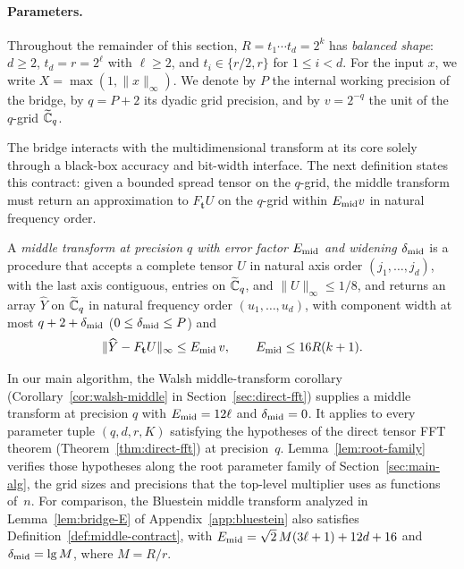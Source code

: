 \paragraph{Parameters.}
Throughout the remainder of this section, $R=t_1\cdots t_d=2^k$ has \emph{balanced shape}: $d\ge 2$, $t_d=r=2^\ell$ with
$\ell\ge 2$, and $t_i\in\{r/2,r\}$ for $1\le i<d$. For the input $x$, we write $X=\max(1,\|x\|_\infty)$. We denote by
$P$ the internal working precision of the bridge, by $q=P+2$ its dyadic grid precision, and by $v=2^{-q}$ the unit of
the $q$-grid $\widetilde{\mathbb{C}}_q$.

The bridge interacts with the multidimensional transform at its core solely through a black-box accuracy and bit-width
interface. The next definition states this contract: given a bounded spread tensor on the $q$-grid, the middle transform
must return an approximation to $F_{\mathbf t}U$ on the $q$-grid within $E_{\rm mid}v$ in natural frequency order.

\begin{definition}\label{def:middle-contract}
A \emph{middle transform at precision $q$ with error factor $E_{\rm mid}$ and widening $\delta_{\rm mid}$} is a
procedure that accepts a complete tensor $U$ in natural axis order $(j_1,\dots,j_d)$, with the last axis contiguous,
entries on $\widetilde{\mathbb{C}}_q$, and $\|U\|_\infty\le 1/8$, and returns an array $\widehat Y$ on $\widetilde{\mathbb{C}}_q$ in natural frequency order
$(u_1,\dots,u_d)$, with component width at most $q+2+\delta_{\rm mid}$ ($0\le\delta_{\rm mid}\le P$) and
\[
  \|\widehat Y-F_{\mathbf t}U\|_\infty\le E_{\rm mid}\,v,\qquad E_{\rm mid}\le 16R(k+1).
\]
\end{definition}

In our main algorithm, the Walsh middle-transform corollary (Corollary~\ref{cor:walsh-middle} in
Section~\ref{sec:direct-fft}) supplies a middle transform at precision $q$ with $E_{\rm mid}=12\ell$ and
$\delta_{\rm mid}=0$. It applies to every parameter tuple $(q,d,r,K)$ satisfying the hypotheses of the direct tensor FFT
theorem (Theorem~\ref{thm:direct-fft}) at precision~$q$. Lemma~\ref{lem:root-family} verifies those hypotheses along
the root parameter family of Section~\ref{sec:main-alg}, the grid sizes and precisions that the top-level multiplier uses
as functions of~$n$. For comparison, the Bluestein middle transform analyzed in Lemma~\ref{lem:bridge-E}
of Appendix~\ref{app:bluestein} also satisfies Definition~\ref{def:middle-contract}, with
$E_{\rm mid}=\sqrt2\,M(3\ell+1)+12d+16$ and $\delta_{\rm mid}=\lg M$, where $M=R/r$.

